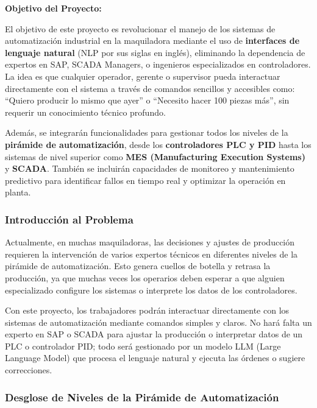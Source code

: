 \documentclass[
  10pt,
  letterpaper,
]{book}
\begin{document}
\textbf{Objetivo del Proyecto:}

El objetivo de este proyecto es revolucionar el manejo de los sistemas
de automatización industrial en la maquiladora mediante el uso de
\textbf{interfaces de lenguaje natural} (NLP por sus siglas en inglés),
eliminando la dependencia de expertos en SAP, SCADA Managers, o
ingenieros especializados en controladores. La idea es que cualquier
operador, gerente o supervisor pueda interactuar directamente con el
sistema a través de comandos sencillos y accesibles como: ``Quiero
producir lo mismo que ayer'' o ``Necesito hacer 100 piezas más'', sin
requerir un conocimiento técnico profundo.

Además, se integrarán funcionalidades para gestionar todos los niveles
de la \textbf{pirámide de automatización}, desde los
\textbf{controladores PLC y PID} hasta los sistemas de nivel superior
como \textbf{MES (Manufacturing Execution Systems)} y \textbf{SCADA}.
También se incluirán capacidades de monitoreo y mantenimiento predictivo
para identificar fallos en tiempo real y optimizar la operación en
planta.

\subsubsection{Introducción al
Problema}\label{introducciuxf3n-al-problema}

Actualmente, en muchas maquiladoras, las decisiones y ajustes de
producción requieren la intervención de varios expertos técnicos en
diferentes niveles de la pirámide de automatización. Esto genera cuellos
de botella y retrasa la producción, ya que muchas veces los operarios
deben esperar a que alguien especializado configure los sistemas o
interprete los datos de los controladores.

Con este proyecto, los trabajadores podrán interactuar directamente con
los sistemas de automatización mediante comandos simples y claros. No
hará falta un experto en SAP o SCADA para ajustar la producción o
interpretar datos de un PLC o controlador PID; todo será gestionado por
un modelo LLM (Large Language Model) que procesa el lenguaje natural y
ejecuta las órdenes o sugiere correcciones.

\subsubsection{Desglose de Niveles de la Pirámide de
Automatización}\label{desglose-de-niveles-de-la-piruxe1mide-de-automatizaciuxf3n}
\end{document}
